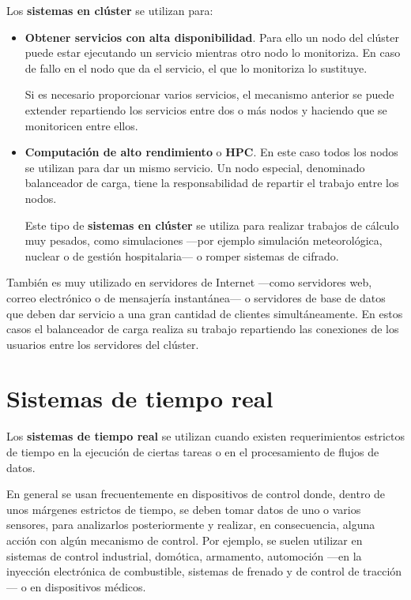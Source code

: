 Los \textbf{sistemas en clúster} se utilizan para:

\begin{itemize}
\item
  \textbf{Obtener servicios con alta disponibilidad}. Para ello un nodo
  del clúster puede estar ejecutando un servicio mientras otro nodo lo
  monitoriza. En caso de fallo en el nodo que da el servicio, el que lo
  monitoriza lo sustituye.

  Si es necesario proporcionar varios servicios, el mecanismo anterior
  se puede extender repartiendo los servicios entre dos o más nodos y
  haciendo que se monitoricen entre ellos.
\item
  \textbf{Computación de alto rendimiento} o \textbf{HPC}. En este caso
  todos los nodos se utilizan para dar un mismo servicio. Un nodo
  especial, denominado balanceador de carga, tiene la responsabilidad de
  repartir el trabajo entre los nodos.

  Este tipo de \textbf{sistemas en clúster} se utiliza para realizar
  trabajos de cálculo muy pesados, como simulaciones ---por ejemplo
  simulación meteorológica, nuclear o de gestión hospitalaria--- o
  romper sistemas de cifrado.
\end{itemize}

También es muy utilizado en servidores de Internet ---como servidores
web, correo electrónico o de mensajería instantánea--- o servidores de
base de datos que deben dar servicio a una gran cantidad de clientes
simultáneamente. En estos casos el balanceador de carga realiza su
trabajo repartiendo las conexiones de los usuarios entre los servidores
del clúster.

\section{Sistemas de tiempo real}\label{_sistemas_de_tiempo_real}

{} Los \textbf{sistemas de {}tiempo real} se utilizan cuando existen
requerimientos estrictos de tiempo en la ejecución de ciertas tareas o
en el procesamiento de flujos de datos.

En general se usan frecuentemente en dispositivos de control donde,
dentro de unos márgenes estrictos de tiempo, se deben tomar datos de uno
o varios sensores, para analizarlos posteriormente y realizar, en
consecuencia, alguna acción con algún mecanismo de control. Por ejemplo,
se suelen utilizar en sistemas de control industrial, domótica,
armamento, automoción ---en la inyección electrónica de combustible,
sistemas de frenado y de control de tracción--- o en dispositivos
médicos.

